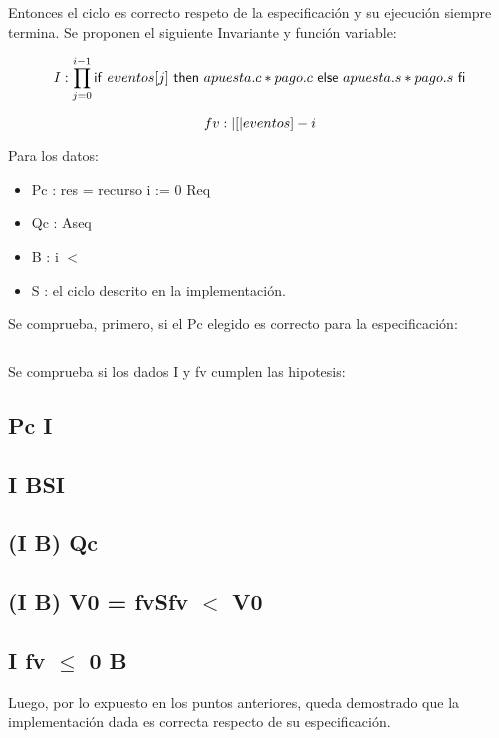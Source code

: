 \documentclass[10pt,a4paper]{article}
\begin{document}
Entonces el ciclo es correcto respeto de la especificación y su ejecución siempre termina.
Se proponen el siguiente Invariante y función variable:

\begin{equation}
	I: \prod\limits_{j=0}^{i-1} \mathsf{if}\ eventos[j]\ \mathsf{then}\ apuesta.c * pago.c\ \mathsf{else}\ apuesta.s * pago.s\ \mathsf{fi}
\end{equation}

\begin{equation}
	fv: |[|eventos] - i
\end{equation}

Para los datos:

\begin{itemize}
	\item Pc : res = recurso \Y i := 0 \Y Req
	\item Qc : Aseq
	\item B : i $<$ \longitud[eventos]
	\item S : el ciclo descrito en la implementación.
\end{itemize}

Se comprueba, primero, si el Pc elegido es correcto para la especificación:

\begin{equation}

\end{equation}

Se comprueba si los dados I y fv cumplen las hipotesis:

\subsection{Pc \implica I}

\subsection{{I \Y B}S{I}}

\subsection{(I \Y \false B) \implica Qc}

\subsection{{(I \Y B) \Y V0 = fv}S{fv $<$ V0}}

\subsection{I \Y fv $\leq$ 0 \implica \false B}

Luego, por lo expuesto en los puntos anteriores, queda demostrado que la implementación dada es correcta respecto de su especificación.
\end{document}
